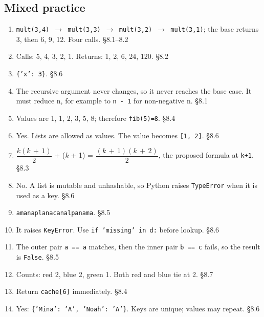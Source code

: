 \documentclass[11pt]{article}
\begin{document}
\begin{keepsection}\subsection{Mixed practice}

\begin{enumerate}
\item \texttt{mult(3,4) \ensuremath{\to} mult(3,3) \ensuremath{\to} mult(3,2) \ensuremath{\to} mult(3,1)}; the base returns 3, then 6, 9, 12. Four calls. \hfill{\small\color{FAUblue}§8.1–8.2}
\item Calls: 5, 4, 3, 2, 1. Returns: 1, 2, 6, 24, 120. \hfill{\small\color{FAUblue}§8.2}
\item \texttt{\{'x': 3\}}. \hfill{\small\color{FAUblue}§8.6}
\item The recursive argument never changes, so it never reaches the base case. It must reduce n, for example to \texttt{n - 1} for non-negative n. \hfill{\small\color{FAUblue}§8.1}
\item Values are 1, 1, 2, 3, 5, 8; therefore \texttt{fib(5)=8}. \hfill{\small\color{FAUblue}§8.4}
\item Yes. Lists are allowed as values. The value becomes \texttt{[1, 2]}. \hfill{\small\color{FAUblue}§8.6}
\item {\small\ensuremath{\dfrac{{k}({k}\, +\, 1)}{2}}} + (\textit{k} + 1) = {\small\ensuremath{\dfrac{({k}\, +\, 1)({k}\, +\, 2)}{2}}}, the proposed formula at \texttt{k+1}. \hfill{\small\color{FAUblue}§8.3}
\item No. A list is mutable and unhashable, so Python raises \texttt{TypeError} when it is used as a key. \hfill{\small\color{FAUblue}§8.6}
\item \texttt{amanaplanacanalpanama}. \hfill{\small\color{FAUblue}§8.5}
\item It raises \texttt{KeyError}. Use \texttt{if 'missing' in d:} before lookup. \hfill{\small\color{FAUblue}§8.6}
\item The outer pair \texttt{a == a} matches, then the inner pair \texttt{b == c} fails, so the result is \texttt{False}. \hfill{\small\color{FAUblue}§8.5}
\item Counts: red 2, blue 2, green 1. Both red and blue tie at 2. \hfill{\small\color{FAUblue}§8.7}
\item Return \texttt{cache[6]} immediately. \hfill{\small\color{FAUblue}§8.4}
\item Yes: \texttt{\{'Mina': 'A', 'Noah': 'A'\}}. Keys are unique; values may repeat. \hfill{\small\color{FAUblue}§8.6}

\end{enumerate}
\end{keepsection}
\end{document}
